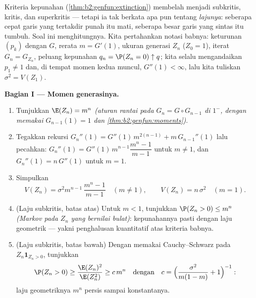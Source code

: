 \begin{problem}\label{pb:b2:genfun:1}
Kriteria kepunahan (\cref{thm:b2:genfun:extinction})
membelah  menjadi
subkritis, kritis, dan superkritis --- tetapi ia tak berkata
apa pun tentang \emph{lajunya}: seberapa cepat garis yang tertakdir punah itu
mati, seberapa besar garis yang sintas itu tumbuh. Soal ini menghitungnya. Kita pertahankan
notasi babnya:  keturunan $(p_k)$ dengan  $G$,
rerata $m = G'(1)$, ukuran generasi $Z_n$ ($Z_0 = 1$), iterat
$G_n = G_{Z_n}$, peluang kepunahan $q_n = \P(Z_n = 0)
\uparrow q$; kita selalu mengandaikan $p_1 \neq 1$ dan, di tempat momen
kedua muncul, $G''(1) < \infty$, lalu kita tuliskan $\sigma^2 =
V(Z_1)$.

\medskip
\noindent\textbf{Bagian I --- Momen generasinya.}
\begin{enumerate}
  \item Tunjukkan $\E(Z_n) = m^n$ \emph{(aturan rantai pada $G_n = G
        \circ G_{n-1}$ di $1^-$, dengan memakai $G_{n-1}(1) = 1$ dan
        \cref{thm:b2:genfun:moments})}.
  \item Tegakkan rekursi $G_n''(1) =
        G''(1)\,m^{2(n-1)} + m\,G_{n-1}''(1)$ lalu pecahkan:
        $G_n''(1) = G''(1)\,m^{n-1}\dfrac{m^n - 1}{m - 1}$
        untuk $m \neq 1$, dan $G_n''(1) = n\,G''(1)$ untuk $m =
        1$.
  \item Simpulkan
        \[
        V(Z_n) = \sigma^2m^{n-1}\,\frac{m^n - 1}{m - 1}
        \quad (m \neq 1),
        \qquad
        V(Z_n) = n\,\sigma^2 \quad (m = 1).
        \]
  \item (Laju subkritis, batas atas) Untuk $m < 1$, tunjukkan
        $\P(Z_n > 0) \leq m^n$ \emph{(Markov pada $Z_n$ yang
        bernilai bulat)}: kepunahannya pasti dengan
        laju geometrik --- yakni penghalusan kuantitatif atas
        kriteria babnya.
  \item (Laju subkritis, batas bawah) Dengan memakai
        Cauchy--Schwarz pada $Z_n\mathbf 1_{Z_n > 0}$, tunjukkan
        \[
        \P(Z_n > 0) \geq \frac{\E(Z_n)^2}{\E(Z_n^2)}
        \geq c\,m^{n}
        \quad\text{dengan}\quad
        c = \Bigl(\frac{\sigma^2}{m(1-m)} + 1\Bigr)^{-1} :
        \]
        laju geometriknya $m^n$ persis sampai konstantanya.
\end{enumerate}


\end{problem}
